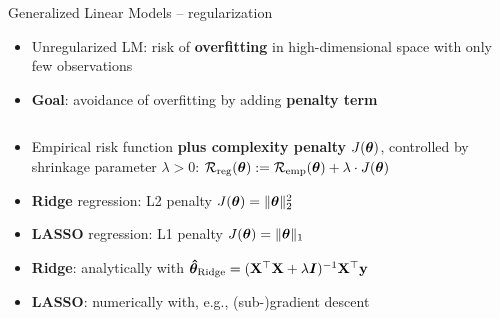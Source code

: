 \begin{frame}{Generalized Linear Models -- regularization}


\begin{itemize}
  \item Unregularized LM: risk of \textbf{overfitting} in high-dimensional 
  space with only few observations
  \item \textbf{Goal}: avoidance of overfitting by adding \textbf{penalty term}
\end{itemize}





\medskip
\begin{columns}[T, totalwidth=\textwidth]
    \begin{column}{0.55\textwidth}
        

\begin{itemize}
  \item Empirical risk function \textbf{plus complexity penalty} 
  $J(\bm{\theta})$, controlled by shrinkage parameter $\lambda > 0$:
  $\mathcal{R}_{\text{reg}}(\bm{\theta}) := \mathcal{R}_{\text{emp}}(\bm{\theta}) + \lambda \cdot J(\bm{\theta})$
    \item \textbf{Ridge} regression: L2 penalty $J(\bm{\theta}) = \|\bm{\theta}\|_2^2 $
    \item \textbf{LASSO} regression: L1 penalty $J(\bm{\theta}) = \|\bm{\theta}\|_1 $
\end{itemize}

\medskip

\begin{itemize}
  \item \textbf{Ridge}: analytically with 
  $\bm{\hat\theta}_{\text{Ridge}} = (\mathbf{X}^\top \mathbf{X}  + \lambda \boldsymbol{I})^{-1} \mathbf{X}^\top 
  \mathbf{y}$
  \item \textbf{LASSO}: numerically with, e.g., (sub-)gradient descent
\end{itemize}




\end{column}
\end{columns}
\end{frame}

